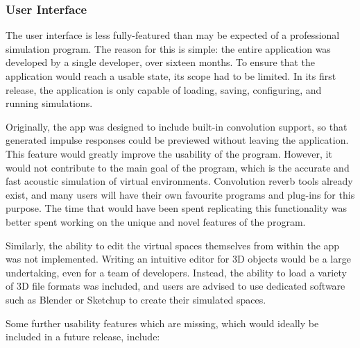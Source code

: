 \documentclass[]{scrreprt}
\begin{document}
\subsubsection{User Interface}\label{user-interface}

The user interface is less fully-featured than may be expected of a
professional simulation program. The reason for this is simple: the
entire application was developed by a single developer, over sixteen
months. To ensure that the application would reach a usable state, its
scope had to be limited. In its first release, the application is only
capable of loading, saving, configuring, and running simulations.

Originally, the app was designed to include built-in convolution
support, so that generated impulse responses could be previewed without
leaving the application. This feature would greatly improve the
usability of the program. However, it would not contribute to the main
goal of the program, which is the accurate and fast acoustic simulation
of virtual environments. Convolution reverb tools already exist, and
many users will have their own favourite programs and plug-ins for this
purpose. The time that would have been spent replicating this
functionality was better spent working on the unique and novel features
of the program.

Similarly, the ability to edit the virtual spaces themselves from within
the app was not implemented. Writing an intuitive editor for 3D objects
would be a large undertaking, even for a team of developers. Instead,
the ability to load a variety of 3D file formats was included, and users
are advised to use dedicated software such as Blender or Sketchup to
create their simulated spaces.

Some further usability features which are missing, which would ideally
be included in a future release, include:
\end{document}
